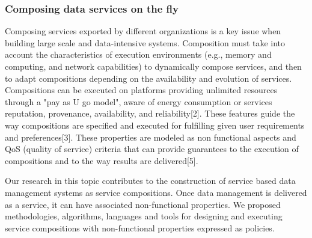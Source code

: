 \subsubsection{Composing data services on the fly }

Composing services  exported by different organizations is a key issue when building  large scale and data-intensive systems. 
Composition must take into account the characteristics of  execution environments (e.g., memory and computing, and network capabilities) to dynamically  compose  services, and then to adapt  compositions depending on the availability and evolution of services. 
 Compositions can be executed  on platforms providing  unlimited resources through a "pay as U go model", aware of energy consumption or services reputation, provenance, availability, and reliability[2].  These features  guide the way compositions are specified and executed for fulfilling given user requirements and preferences[3]. These properties are modeled as  non functional aspects and QoS (quality of service) criteria  that can provide guarantees to the execution of compositions and to the way results are delivered[5].

Our research in this topic contributes to the construction of service based data management systems as service compositions. Once data management is delivered as a service, it can have associated non-functional properties.
We proposed methodologies, algorithms, languages and tools for designing and executing  service compositions with non-functional properties expressed as policies. 

